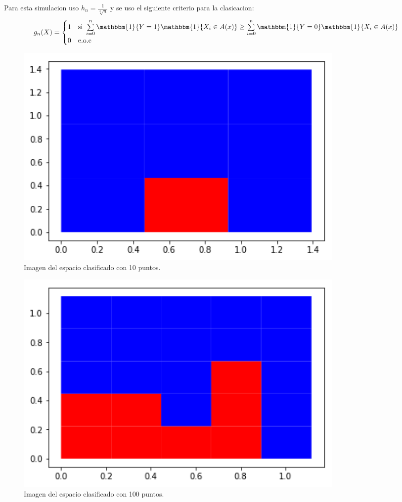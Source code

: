 \documentclass[12pt, a4paper]{article}
\begin{document}
Para esta simulacion uso $h_n = \frac{1}{\sqrt[3]{n}}$ y se uso el siguiente criterio para la clasicacion:
		$$g_n(X)=
		\begin{cases}
		    1   &\text{si } \sum\limits_{i = 0}^{n}\mathbbm{1}\{Y=1\}\mathbbm{1}\{X_i \in A(x)\} \geq \sum\limits_{i = 0}^{n}\mathbbm{1}\{Y=0\}\mathbbm{1}\{X_i \in A(x)\}      \\
		    0 &\text{e.o.c}
		\end{cases}
		$$
\begin{center}
	\begin{figure}[H]
	    \includegraphics[width = 0.8\textwidth]{grafico_10_puntos}
	    \caption{Imagen del espacio clasificado con 10 puntos.}
	\end{figure}

	\begin{figure}[H]
	    \includegraphics[width = 0.8\textwidth]{grafico_100_puntos}
	    \caption{Imagen del espacio clasificado con 100 puntos.}
	\end{figure}


\end{center}
\end{document}
